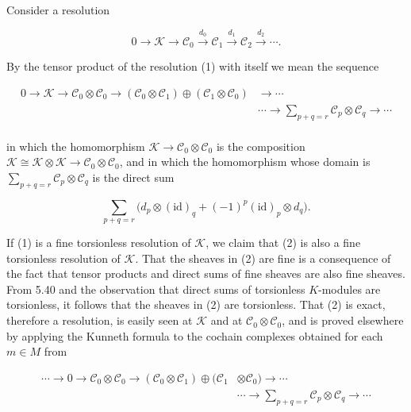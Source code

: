 \label{thm:5.42}Consider a resolution

\begin{equation}
\tag{1}\label{eq:5.42:1}
0\to\mathcal{K}\to\mathcal{C}_{0}\xrightarrow{d_{0}}\mathcal{C}_{1}\xrightarrow{d_{1}}\mathcal{C}_{2}\xrightarrow{d_{2}}\cdots.
\end{equation}

By the tensor product of the resolution (1) with itself we mean the sequence

\begin{equation}
\tag{2}\label{eq:5.42:2}
\begin{aligned}{0\to\mathcal{K}\to\mathcal{C}_{0}\otimes\mathcal{C}_{0}\to(\mathcal{C}_{0}\otimes\mathcal{C}_{1})\oplus(\mathcal{C}_{1}\otimes\mathcal{C}_{0})}&{{}\to\cdots}\\ {}&{{}\cdots\to\sum_{p+q=r}\mathcal{C}_{p}\otimes\mathcal{C}_{q}\to\cdots}\\ \end{aligned}
\end{equation}

in which the homomorphism $\mathcal{K}\to\mathcal{C}_{0}\otimes\mathcal{C}_{0}$ is the composition $\mathcal{K}\cong\mathcal{K}\otimes\mathcal{K}\to\mathcal{C}_{0}\otimes\mathcal{C}_{0}$, and in which the homomorphism whose domain is $\sum_{p+q=r}\mathcal{C}_{p}\otimes\mathcal{C}_{q}$ is the direct sum

\begin{equation}
\tag{3}\label{eq:5.42:3}
\sum_{p+q=r}\bigl(d_{p}\otimes(\mathrm{id})_{q}+(-1)^{p}(\mathrm{id})_{p}\otimes d_{q}\bigr).
\end{equation}

If (1) is a fine torsionless resolution of $\mathcal{K}$, we claim that (2) is also a fine torsionless resolution of $\mathcal{K}$. That the sheaves in (2) are fine is a consequence of the fact that tensor products and direct sums of fine sheaves are also fine sheaves. From 5.40 and the observation that direct sums of torsionless $K$-modules are torsionless, it follows that the sheaves in (2) are torsionless. That (2) is exact, therefore a resolution, is easily seen at $\mathcal{K}$ and at $\mathcal{C}_0 \otimes \mathcal{C}_0$, and is proved elsewhere by applying the Kunneth formula to the cochain complexes obtained for each $m \in M$ from

\begin{equation}
\tag{4}\label{eq:5.42:4}
\begin{aligned}\cdots\to0\to\mathcal{C}_{0}\otimes\mathcal{C}_{0}\to(\mathcal{C}_{0}\otimes\mathcal{C}_{1})\oplus(\mathcal{C}_{1}&\otimes\mathcal{C}_{0})\to\cdots\\&\cdots\to\sum_{p+q=r}\mathcal{C}_{p}\otimes\mathcal{C}_{q}\to\cdots\end{aligned}
\end{equation}

